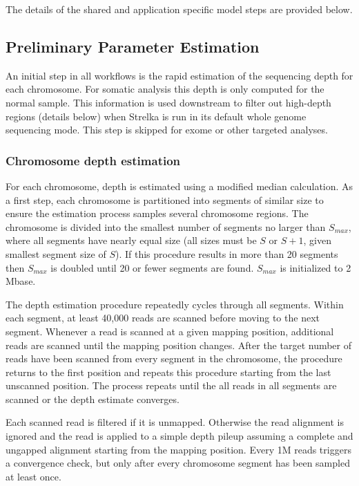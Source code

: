 \documentclass{article}
\begin{document}
The details of the shared and application specific model steps are provided below.


\subsection{Preliminary Parameter Estimation}

An initial step in all workflows is the rapid estimation of the sequencing depth for each chromosome. For somatic analysis this depth is only computed for the normal sample. This information is used downstream to filter out high-depth regions (details below) when Strelka is run in its default whole genome sequencing mode. This step is skipped for exome or other targeted analyses.

\subsubsection{Chromosome depth estimation}
\label{sec:depth_est}

For each chromosome, depth is estimated using a modified median calculation. As a first step, each chromosome is partitioned into segments of similar size to ensure the estimation process samples several chromosome regions. The chromosome is divided into the smallest number of segments no larger than $S_{max}$, where all segments have nearly equal size (all sizes must be $S$ or $S+1$, given smallest segment size of $S$). If this procedure results in more than 20 segments then $S_{max}$ is doubled until 20 or fewer segments are found. $S_{max}$ is initialized to 2 Mbase.

The depth estimation procedure repeatedly cycles through all segments. Within each segment, at least 40,000 reads are scanned before moving to the next segment. Whenever a read is scanned at a given mapping position, additional reads are scanned until the mapping position changes. After the target number of reads have been scanned from every segment in the chromosome, the procedure returns to the first position and repeats this procedure starting from the last unscanned position. The process repeats until the all reads in all segments are scanned or the depth estimate converges.

Each scanned read is filtered if it is unmapped. Otherwise the read alignment is ignored and the read is applied to a simple depth pileup assuming a complete and ungapped alignment starting from the mapping position. Every 1M reads triggers a convergence check, but only after every chromosome segment has been sampled at least once.
\end{document}
